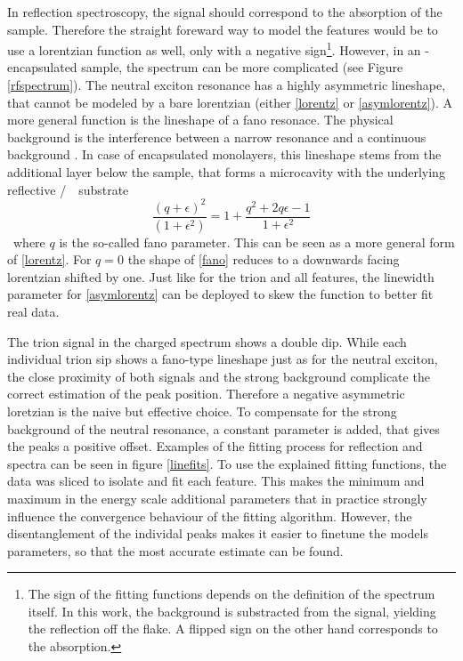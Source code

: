 In reflection spectroscopy, the signal should correspond to the absorption of the sample. Therefore the straight foreward way to model the features would be to use a lorentzian function as well, only with a negative sign\footnote{The sign of the fitting functions depends on the definition of the spectrum itself. In this work, the background is substracted from the signal, yielding the reflection off the flake. A flipped sign on the other hand corresponds to the absorption.}. However, in an \hbn-encapsulated sample, the spectrum can be more complicated (see Figure \ref{rfspectrum}). The neutral exciton resonance has a highly asymmetric lineshape, that cannot be modeled by a bare lorentzian (either \eqref{lorentz} or \eqref{asymlorentz}). A more general function is the lineshape of a fano resonace. The physical background is the interference between a narrow resonance and a continuous background \cite{fano_effects_1961}. In case of encapsulated \tmdg monolayers, this lineshape stems from the additional \hbng layer below the sample, that forms a microcavity with the underlying reflective \si/\sio substrate \cite{scuri_large_2018}.
\begin{equation}
\frac{(q+\epsilon)^2}{(1+\epsilon^2)} = 1 + \frac{q^2+2q\epsilon-1}{1+\epsilon^2}\label{fano}
\end{equation}
where $q$ is the so-called fano parameter. This can be seen as a more general form of \eqref{lorentz}. For $q=0$ the shape of \eqref{fano} reduces to a downwards facing lorentzian shifted by one. Just like for the trion and all \pl features, the linewidth parameter for \eqref{asymlorentz} can be deployed to skew the function to better fit real data.

The trion signal in the charged spectrum shows a double dip. While each individual trion sip shows a fano-type lineshape just as for the neutral exciton, the close proximity of both signals and the strong background complicate the correct estimation of the peak position. Therefore a negative asymmetric loretzian is the naive but effective choice. To compensate for the strong background of the neutral resonance, a constant parameter is added, that gives the peaks a positive offset. 
Examples of the fitting process for reflection and \pl spectra can be seen in figure \ref{linefits}. To use the explained fitting functions, the data was sliced to isolate and fit each feature. This makes the minimum and maximum in the energy scale additional parameters that in practice strongly influence the convergence behaviour of the fitting algorithm. However, the disentanglement of the individal peaks makes it easier to finetune the models parameters, so that the most accurate estimate can be found.

